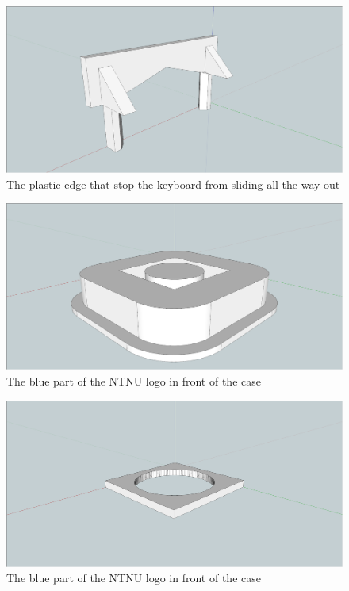 \newpage
\begin{figure}
\includegraphics[width=\textwidth,keepaspectratio,clip]{appendix/screen-shots/keyboard-stopper.png}%
\caption{The plastic edge that stop the keyboard from sliding all the way out}
\end{figure}
\newpage
\begin{figure}
\includegraphics[width=\textwidth,keepaspectratio,clip]{appendix/screen-shots/ntnu-logo-blue.png}%
\caption{The blue part of the NTNU logo in front of the case}
\end{figure}
\newpage
\begin{figure}
\includegraphics[width=\textwidth,keepaspectratio,clip]{appendix/screen-shots/ntnu-logo-yellow.png}%
\caption{The blue part of the NTNU logo in front of the case}
\end{figure}
